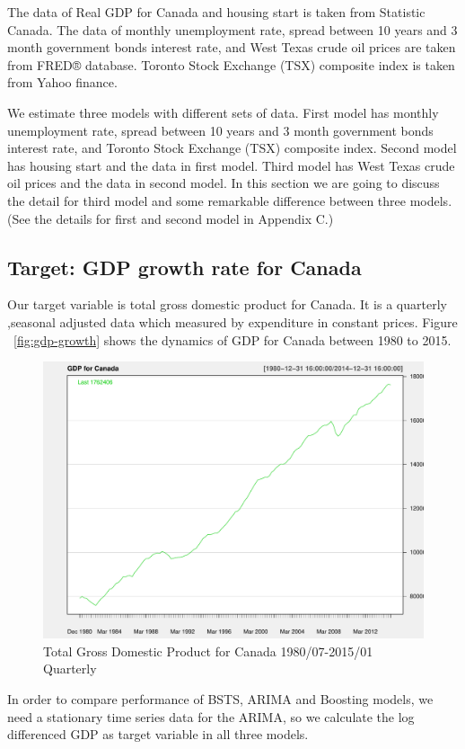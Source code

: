 The data of Real GDP for Canada and housing start is taken from Statistic Canada. The data of monthly unemployment rate,  spread between 10 years and 3 month government bonds interest rate, and   West Texas crude oil prices are taken from FRED® database. Toronto Stock Exchange (TSX) composite index is taken from Yahoo finance. 

We estimate three models with different sets of data. First model has  monthly unemployment rate, spread between 10 years and 3 month government bonds interest rate, and Toronto Stock Exchange (TSX) composite index. Second model has housing start and the data in first model. Third model has West Texas crude oil prices and the data in second model. In this section we are going to discuss the detail for third model and some remarkable difference between three models. (See the details for first and second model  in Appendix C.)  




\subsection{Target: GDP growth rate for Canada}

Our target variable is total gross domestic product for Canada. It is a quarterly ,seasonal adjusted data which measured by expenditure in constant prices. Figure ~\ref{fig:gdp-growth} shows the dynamics of GDP for Canada between 1980 to 2015.


\begin{figure}[h]
\centering
\includegraphics[width=0.6\linewidth]{Figures/gdp-report}
\caption{Total Gross Domestic Product for Canada 1980/07-2015/01 Quarterly}
\label{fig:gdp-report}
\end{figure}



In order to compare performance of BSTS, ARIMA and Boosting models, we need a stationary time series data for the ARIMA, so we calculate the log differenced GDP as target variable in all three models. 

